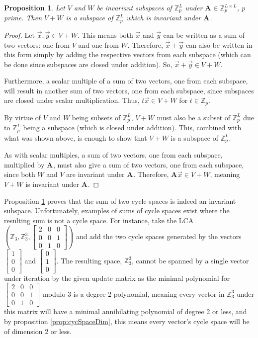 \documentclass[a4paper, 12pt, reqno]{amsart}
\newtheorem{prop}{Proposition}
\newcommand{\Z}{\mathbb{Z}}
\newcommand\Mat[2][]{\mathbf{#1}^{\!#2}}
\newcommand\smallmat[1]{\left[\begin{smallmatrix}#1\end{smallmatrix}\right]}
\begin{document}
	\begin{prop}
		\label{prop:cycSpaceSumSubspace}
		Let $V$ and $W$ be invariant subspaces of $\Z_p^L$ under $\Mat[A]{} \in \Z_p^{L \times L}$, $p$ prime. Then $V + W$ is a subspace of $\Z_p^L$ which is invariant under 
		$\Mat[A]{}$.
	\end{prop}
	\begin{proof}
		Let $\vec{x}, \vec{y} \in V + W$. This means both $\vec{x}$ and $\vec{y}$ can be written as a sum of two vectors: one from $V$ and one from $W$. Therefore, 
		$\vec{x} + \vec{y}$ can also be written in this form simply by adding the respective vectors from each subspace (which can be done since subspaces are closed under 
		addition). So, $\vec{x} + \vec{y} \in V + W$.
		
		Furthermore, a scalar multiple of a sum of two vectors, one from each subspace, will result in another sum of two vectors, one from each subspace, since subspaces are
		closed under scalar multiplication. Thus, $t\vec{x} \in V + W$ for $t \in \Z_p$.
		
		By virtue of $V$ and $W$ being subsets of $\Z_p^L$, $V + W$ must also be a subset of $\Z_p^L$ due to $\Z_p^L$ being a subspace (which is closed under addition). This, 
		combined with what was shown above, is enough to show that $V + W$ is a subspace of $\Z_p^L$.
		
		As with scalar multiples, a sum of two vectors, one from each subspace, multiplied by $\Mat[A]{}$, must also give a sum of two vectors, one from each subspace, since
		both $W$ and $V$ are invariant under $\Mat[A]{}$. Therefore, $\Mat[A]{}\vec{x} \in V + W$, meaning $V + W$ is invariant under $\Mat[A]{}$.
	\end{proof}
	
	Proposition \ref{prop:cycSpaceSumSubspace} proves that the sum of two cycle spaces is indeed an invariant subspace. Unfortunately, examples of sums of cycle spaces exist
	where the resulting sum is not a cycle space. For instance, take the LCA $\left(\Z_3, \Z_3^3, \smallmat{2 & 0 & 0\\0 & 0 & 1\\0 & 1 & 0}\right)$ and add the two cycle 
	spaces generated by the vectors $\smallmat{1\\0\\0}$ and $\smallmat{0\\1\\0}$. The resulting space, $\Z_3^3$, cannot be spanned by a single vector under iteration by the 
	given update matrix as the minimal polynomial for $\smallmat{2 & 0 & 0\\0 & 0 & 1\\0 & 1 & 0}$ modulo 3 is a degree 2 polynomial, meaning every vector in $\Z_3^3$ under 
	this matrix will have a minimal annihilating polynomial of degree 2 or less, and by proposition \ref{prop:cycSpaceDim}, this means every vector's cycle space will be of 
	dimension 2 or less.
	
\end{document}
